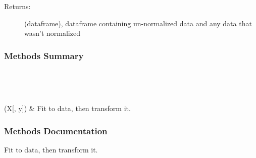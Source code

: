 \documentclass[letterpaper,10pt,english]{sphinxmanual}
\begin{document}
\begin{fulllineitems}
\begin{description}
\begin{description}
\begin{description}
\item[{Returns:}] \leavevmode
(dataframe), dataframe containing un-normalized data and any data that wasn’t normalized

\end{description}

\end{description}

\end{description}
\subsubsection*{Methods Summary}


\begin{savenotes}\sphinxatlongtablestart\begin{longtable}[c]{}
\hline

\endfirsthead

%
{}\\
\hline

\endhead

\hline
{}\\
\endfoot

\endlastfoot

{\hyperref[\detokenize{api/mastml.preprocessing.MeanStdevScaler:mastml.preprocessing.MeanStdevScaler.fit_transform}]{}}(X{[}, y{]})
&
Fit to data, then transform it.
\\
\hline
\end{longtable}\sphinxatlongtableend\end{savenotes}
\subsubsection*{Methods Documentation}

\begin{fulllineitems}
\label{\detokenize{api/mastml.preprocessing.MeanStdevScaler:mastml.preprocessing.MeanStdevScaler.fit_transform}}
Fit to data, then transform it.


\end{fulllineitems}
\end{fulllineitems}
\end{document}
